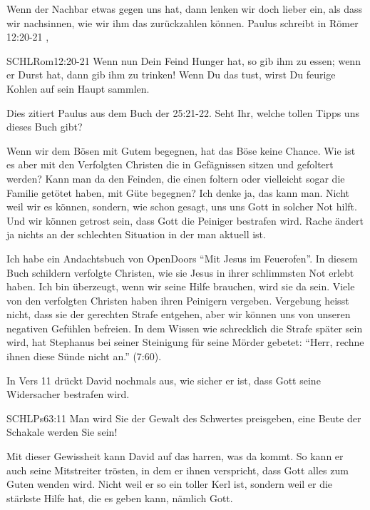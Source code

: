 \documentclass[14pt]{../../inc/mybib}
\begin{document}
    \begin{block}
    Wenn der Nachbar etwas gegen uns hat, dann lenken wir doch lieber ein, als dass wir nachsinnen, wie wir ihm das zurückzahlen können. Paulus schreibt in Römer 12:20-21 , 
    \begin{bibelbox}{SCHL}{Rom}{12:20-21}
        Wenn nun Dein Feind Hunger hat, so gib ihm zu essen; wenn er Durst hat, dann gib ihm zu trinken! Wenn Du das tust, wirst Du feurige Kohlen auf sein Haupt sammlen.
    \end{bibelbox}
    Dies zitiert Paulus aus dem Buch der  {25:21-22}. Seht Ihr, welche tollen Tipps uns dieses Buch gibt? 

    Wenn wir dem Bösen mit Gutem begegnen, hat das Böse keine Chance. Wie ist es aber mit den Verfolgten Christen die in Gefägnissen sitzen und gefoltert werden? Kann man da den Feinden, die einen foltern oder vielleicht sogar die Familie getötet haben, mit Güte begegnen? Ich denke ja, das kann man. Nicht weil wir es können, sondern, wie schon gesagt, uns uns Gott in solcher Not hilft. Und wir können getrost sein, dass Gott die Peiniger bestrafen wird. Rache ändert ja nichts an der schlechten Situation in der man aktuell ist. 
    
    Ich habe ein Andachtsbuch von OpenDoors \enquote{Mit Jesus im Feuerofen}. In diesem Buch schildern verfolgte Christen, wie sie Jesus in ihrer schlimmsten Not erlebt haben. Ich bin überzeugt, wenn wir seine Hilfe brauchen, wird sie da sein. Viele von den verfolgten Christen haben ihren Peinigern vergeben. Vergebung heisst nicht, dass sie der gerechten Strafe entgehen, aber wir können uns von unseren negativen Gefühlen befreien. In dem Wissen wie schrecklich die Strafe später sein wird, hat Stephanus bei seiner Steinigung für seine Mörder gebetet: \enquote{Herr, rechne ihnen diese Sünde nicht an.} (7:60).
\end{block}
\begin{block}
    In Vers 11 drückt David nochmals aus, wie sicher er ist, dass Gott seine Widersacher bestrafen wird.
    \begin{bibelbox}{SCHL}{Ps}{63:11}
        Man wird Sie der Gewalt des Schwertes preisgeben, eine Beute der Schakale werden Sie sein!
    \end{bibelbox}
    Mit dieser Gewissheit kann David auf das harren, was da kommt. So kann er auch seine Mitstreiter trösten, in dem er ihnen verspricht, dass Gott alles zum Guten wenden wird. 
    Nicht weil er so ein toller Kerl ist, sondern weil er die stärkste Hilfe hat, die es geben kann, nämlich Gott. 
\end{block}
\end{document}
